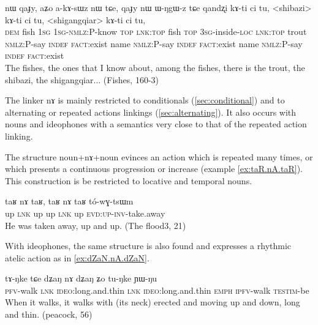 \documentclass[oldfontcommands,oneside,a4paper,11pt]{article}
\newcommand{\ipa}[1]{{\phon \mbox{#1}}} %
\begin{document}
 \begin{exe}
\ex \label{ex:qaJy} 
\gll
\ipa{nɯ}  	\ipa{qaɟy,}  	\ipa{aʑo}  	\ipa{a-kɤ-sɯz}  	\ipa{nɯ}  	\ipa{tɕe,}  	\ipa{qaɟy}  	\ipa{nɯ}  	\ipa{ɯ-ŋgɯ-z}  	\ipa{tɕe}  	\ipa{qandʐi}  	\ipa{kɤ-ti}  	\ipa{ci}  	\ipa{tu,}  	<shibazi>  	\ipa{kɤ-ti}  	\ipa{ci}  	\ipa{tu,}  	<shigangqiar>  	\ipa{kɤ-ti}  	\ipa{ci}  	\ipa{tu,}  \\
\textsc{dem} fish \textsc{1sg} \textsc{1sg-nmlz:P}-know \textsc{top} \textsc{lnk:top} fish \textsc{top} \textsc{3sg}-inside-\textsc{loc} \textsc{lnk:top}  trout \textsc{nmlz}:P-say \textsc{indef} \textsc{fact}:exist   name  \textsc{nmlz}:P-say \textsc{indef} \textsc{fact}:exist   name  \textsc{nmlz}:P-say \textsc{indef} \textsc{fact}:exist  \\
\glt The fishes, the ones that I know about, among the fishes, there is the trout, the shibazi, the shigangqiar... (Fishes, 160-3)
\end{exe}

The linker \ipa{nɤ} is mainly restricted to conditionals (\ref{sec:conditional}) and to alternating or repeated actions linkings (\ref{sec:alternating}). It also occurs with nouns  and ideophones with a semantics very close to that of the repeated action linking. 

The structure noun+\ipa{nɤ}+noun   evinces an action which is repeated many times, or which presents a continuous progression or increase   (example \ref{ex:taR.nA.taR}). This construction is be restricted to locative and temporal nouns. 

 \begin{exe}
\ex \label{ex:taR.nA.taR} 
\gll
\ipa{taʁ}   	\ipa{nɤ}   	\ipa{taʁ,}   	\ipa{taʁ}   	\ipa{nɤ}   	\ipa{taʁ}   	\ipa{tó-wɣ-tsɯm}   \\
up \textsc{lnk} up up \textsc{lnk} up \textsc{evd:up-inv-}take.away \\
\glt He was taken away, up and up. (The flood3, 21)
\end{exe}

With  ideophones, the same structure  is also found and expresses a rhythmic atelic action as in \ref{ex:dZaN.nA.dZaN}.
 
 \begin{exe}
\ex \label{ex:dZaN.nA.dZaN} 
\gll
\ipa{tɤ-ŋke}   	\ipa{tɕe}   	\ipa{dʑaŋ} \ipa{nɤ}   	\ipa{dʑaŋ}   	\ipa{ʑo}   	\ipa{tu-ŋke}   	\ipa{ɲɯ-ŋu}   \\
\textsc{pfv}-walk \textsc{lnk} \textsc{ideo}:long.and.thin \textsc{lnk}  \textsc{ideo}:long.and.thin \textsc{emph} \textsc{ipfv}-walk \textsc{testim}-be \\
\glt When it walks, it walks with (its neck) erected and moving up and down, long and thin. (peacock, 56)
\end{exe}
\end{document}

